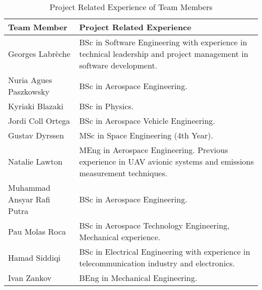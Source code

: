 \begin{table}[H]
\centering
\begin{tabular}{|l|m{11cm}|}
\hline
\textbf{Team Member} & \textbf{Project Related Experience} \\ \hline
Georges Labrèche & BSc in Software Engineering with experience in technical leadership and project management in software development.\\ \hline
Nuria Agues Paszkowsky & BSc in Aerospace Engineering.\\ \hline
Kyriaki Blazaki & BSc in Physics. \\ \hline
Jordi Coll Ortega &  BSc in Aerospace Vehicle Engineering. \\ \hline
Gustav Dyrssen &  MSc in Space Engineering (4th Year).\\ \hline
Natalie Lawton & MEng in Aerospace Engineering. Previous experience in UAV avionic systems and emissions measurement techniques. \\ \hline
Muhammad Ansyar Rafi Putra & BSc in Aerospace Engineering. \\ \hline
Pau Molas Roca & BSc in Aerospace Technology Engineering, Mechanical experience. \\ \hline
Hamad Siddiqi & BSc in Electrical Engineering with experience in telecommunication industry and electronics.  \\ \hline
Ivan Zankov & BEng in Mechanical Engineering.\\ \hline
\end{tabular}
\caption{Project Related Experience of Team Members}
\label{tab:team-member-experience}
\end{table}
\raggedbottom
